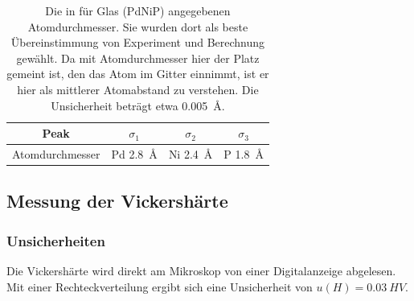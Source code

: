 \documentclass[
	a4paper,
	12pt,
	pagesize,
	ngerman
]{scrartcl}
\begin{document}
	\begin{table}[H]
		\centering
		\begin{tabular}{ c | c | c | c }
			 Peak&  $\sigma_1$ & $\sigma_2$ & $\sigma_3$\\ \hline
			  Atomdurchmesser & Pd \SI{2.8}{\angstrom} & Ni \SI{2.4}{\angstrom} & P \SI{1.8}{\angstrom}
		\end{tabular}
		\caption{Die in \cite{SIETSMA1991146} für Glas (PdNiP) angegebenen Atomdurchmesser. Sie wurden dort als beste Übereinstimmung von Experiment und Berechnung gewählt. Da mit Atomdurchmesser hier der Platz gemeint ist, den das Atom im Gitter einnimmt, ist er hier als mittlerer Atomabstand zu verstehen. Die Unsicherheit beträgt etwa \SI{0.005}{\angstrom}.} %
		\label{tb_xrd_vgl}
\end{table}


	\subsection{Messung der Vickershärte}
	\subsubsection{Unsicherheiten} \label{sss_vicker_unsicher}
	Die Vickershärte wird direkt am Mikroskop von einer Digitalanzeige abgelesen.
	Mit einer Rechteckverteilung ergibt sich eine Unsicherheit von $u(H) = \SI{0.03}{HV}$.
\end{document}
